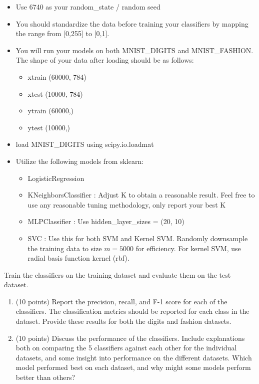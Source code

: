 \documentclass[12pt]{article}
\begin{document}
\begin{itemize}[noitemsep]

\item Use 6740 as your random\_state / random seed
\item You should standardize the data before training your classifiers by mapping the range from [0,255] to [0,1].

\item You will run your models on both MNIST\_DIGITS and MNIST\_FASHION. The shape of your data after loading should be as follows:
    \begin{itemize}
        \item xtrain (60000, 784)
        \item xtest (10000, 784)
        \item ytrain (60000,)
        \item ytest (10000,)
    \end{itemize}

\item load MNIST\_DIGITS using scipy.io.loadmat

\item Utilize the following models from sklearn: 
  \begin{itemize}
    \item LogisticRegression
    \item KNeighborsClassifier : Adjust K to obtain a reasonable result. Feel free to use any reasonable tuning methodology, only report your best K
    \item MLPClassifier : Use \textsf{hidden\_layer\_sizes = (20, 10)}
    \item SVC : Use this for both SVM and Kernel SVM. Randomly downsample the training data to size $m=5000$ for efficiency. For kernel SVM, use radial basis function kernel (rbf).
  \end{itemize}
\end{itemize}

Train the classifiers on the training dataset and evaluate them on the test dataset.

\begin{enumerate}

\item (10 points) Report the precision, recall, and F-1 score for each of the classifiers. The classification metrics should be reported for each class in the dataset. Provide these results for both the digits and fashion datasets.

 
\item (10 points) Discuss the performance of the classifiers. Include explanations both on comparing the 5 classifiers against each other for the individual datasets, and some insight into performance on the different datasets. Which model performed best on each dataset, and why might some models perform better than others?

 
\end{enumerate}
\end{document}
